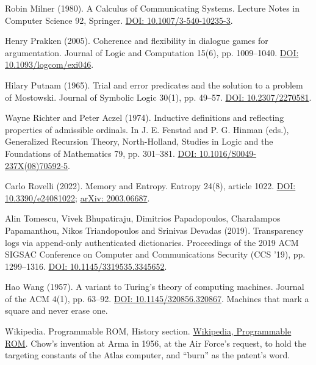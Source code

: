 \documentclass[11pt,twoside]{article}
\theoremstyle{thielethm}
\theoremstyle{thieledef}
\theoremstyle{thieledef}
\theoremstyle{thieledef}
\theoremstyle{thielethm}
\theoremstyle{thieleobs}
\theoremstyle{thielethm}
\begin{document}
\noindent Robin Milner (1980). A Calculus of Communicating Systems. Lecture Notes in Computer Science 92, Springer. \href{https://doi.org/10.1007/3-540-10235-3}{DOI: 10.1007/3-540-10235-3}.
\par\medskip

\noindent Henry Prakken (2005). Coherence and flexibility in dialogue games for argumentation. Journal of Logic and Computation 15(6), pp. 1009--1040. \href{https://doi.org/10.1093/logcom/exi046}{DOI: 10.1093/logcom/exi046}.
\par\medskip

\noindent Hilary Putnam (1965). Trial and error predicates and the solution to a problem of Mostowski. Journal of Symbolic Logic 30(1), pp. 49--57. \href{https://doi.org/10.2307/2270581}{DOI: 10.2307/2270581}.
\par\medskip

\noindent Wayne Richter and Peter Aczel (1974). Inductive definitions and reflecting properties of admissible ordinals. In J. E. Fenstad and P. G. Hinman (eds.), Generalized Recursion Theory, North-Holland, Studies in Logic and the Foundations of Mathematics 79, pp. 301--381. \href{https://doi.org/10.1016/S0049-237X(08)70592-5}{DOI: 10.1016/S0049-237X(08)70592-5}.
\par\medskip

\noindent Carlo Rovelli (2022). Memory and Entropy. Entropy 24(8), article 1022. \href{https://doi.org/10.3390/e24081022}{DOI: 10.3390/e24081022}; \href{https://arxiv.org/abs/2003.06687}{arXiv: 2003.06687}.
\par\medskip

\noindent Alin Tomescu, Vivek Bhupatiraju, Dimitrios Papadopoulos, Charalampos Papamanthou, Nikos Triandopoulos and Srinivas Devadas (2019). Transparency logs via append-only authenticated dictionaries. Proceedings of the 2019 ACM SIGSAC Conference on Computer and Communications Security (CCS '19), pp. 1299--1316. \href{https://doi.org/10.1145/3319535.3345652}{DOI: 10.1145/3319535.3345652}.
\par\medskip

\noindent Hao Wang (1957). A variant to Turing's theory of computing machines. Journal of the ACM 4(1), pp. 63--92. \href{https://doi.org/10.1145/320856.320867}{DOI: 10.1145/320856.320867}. Machines that mark a square and never erase one.
\par\medskip

\noindent Wikipedia. Programmable ROM, History section. \href{https://en.wikipedia.org/wiki/Programmable_ROM}{Wikipedia, Programmable ROM}. Chow's invention at Arma in 1956, at the Air Force's request, to hold the targeting constants of the Atlas computer, and ``burn'' as the patent's word.
\par\medskip
\end{document}
